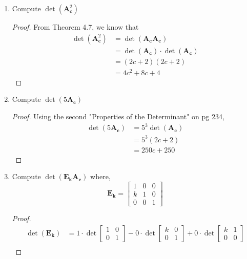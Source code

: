 \documentclass[11pt]{scrartcl}
\begin{document}
\begin{enumerate}[label=\alph*.]
{	      }
	\item{
	      Compute $\det(\mathbf{A}_{\mathbf{c}}^2)$
	      \begin{proof}
		      From Theorem 4.7, we know that
		      \begin{align*}
			      \det(\mathbf{A}_{\mathbf{c}}^2) & = \det(\mathbf{A}_{\mathbf{c}}\mathbf{A}_{\mathbf{c}})              \\
			                                      & = \det(\mathbf{A}_{\mathbf{c}}) \cdot \det(\mathbf{A}_{\mathbf{c}}) \\
			                                      & = (2c + 2) (2c + 2)                                                 \\
			                                      & = 4c^2+8c+4
		      \end{align*}
	      \end{proof}
	      }
	\item{
	      Compute $\det(5\mathbf{A}_{\mathbf{c}})$
	      \begin{proof}
		      Using the second "Properties of the Determinant" on pg 234,
		      \begin{align*}
			      \det(5\mathbf{A}_{\mathbf{c}}) & = 5^3\det(\mathbf{A}_{\mathbf{c}}) \\
			                                     & = 5^3(2c + 2)                      \\
			                                     & = 250c + 250
		      \end{align*}
	      \end{proof}
	      }
	\item{
	      Compute $\det(\mathbf{E}_{\mathbf{k}}\mathbf{A}_{\mathbf{c}})$ where,
	      $$
		      \mathbf{E}_{\mathbf{k}} = \begin{bmatrix}
			      1 & 0 & 0 \\
			      k & 1 & 0 \\
			      0 & 0 & 1
		      \end{bmatrix}
	      $$
	      \begin{proof}
		      \begin{align*}
			      \det(\mathbf{E}_{\mathbf{k}}) & = 1\cdot \det \begin{bmatrix}1&0\\ 0&1\end{bmatrix}-0\cdot \det \begin{bmatrix}k&0\\ 0&1\end{bmatrix}+0\cdot \det \begin{bmatrix}k&1\\ 0&0\end{bmatrix} \\

\end{align*}
\end{proof}}
\end{enumerate}
\end{document}
